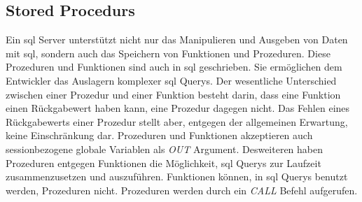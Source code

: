 \subsection{Stored Procedurs}\label{subsec:storedProc}
Ein \ac{sql} Server unterstützt nicht nur das Manipulieren und Ausgeben von Daten mit \ac{sql}, sondern auch das Speichern von Funktionen und Prozeduren.
Diese Prozeduren und Funktionen sind auch in \ac{sql} geschrieben.
Sie ermöglichen dem Entwickler das Auslagern komplexer \ac{sql} Querys.
Der wesentliche Unterschied zwischen einer Prozedur und einer Funktion besteht darin, dass eine Funktion einen Rückgabewert haben kann, eine Prozedur dagegen nicht.
Das Fehlen eines Rückgabewerts einer Prozedur stellt aber, entgegen der allgemeinen Erwartung, keine Einschränkung dar. 
Prozeduren und Funktionen akzeptieren auch sessionbezogene globale Variablen als \emph{OUT} Argument. 
Desweiteren haben Prozeduren entgegen Funktionen die Möglichkeit, \ac{sql} Querys zur Laufzeit zusammenzusetzen und auszuführen.
Funktionen können, in \ac{sql} Querys benutzt werden, Prozeduren nicht.
Prozeduren werden durch ein \emph{CALL} Befehl aufgerufen.

